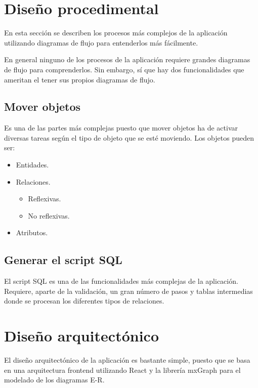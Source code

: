 \section{Diseño procedimental}
En esta sección se describen los procesos más complejos de la aplicación utilizando diagramas de flujo para entenderlos más fácilmente.

En general ninguno de los procesos de la aplicación requiere grandes diagramas de flujo para comprenderlos. Sin embargo, sí que hay dos funcionalidades que ameritan el tener sus propios diagramas de flujo.

\subsection{Mover objetos}
Es una de las partes más complejas puesto que mover objetos ha de activar diversas tareas según el tipo de objeto que se esté moviendo.
Los objetos pueden ser:
\begin{itemize}
    \item Entidades.
    \item Relaciones.
    \begin{itemize}
        \item Reflexivas.
        \item No reflexivas.
    \end{itemize}
    \item Atributos.
\end{itemize}


\subsection{Generar el script SQL}
El script SQL es una de las funcionalidades más complejas de la aplicación. Requiere, aparte de la validación, un gran número de pasos y tablas intermedias donde se procesan los diferentes tipos de relaciones.


\section{Diseño arquitectónico}
El diseño arquitectónico de la aplicación es bastante simple, puesto que se basa en una arquitectura frontend utilizando React y la librería mxGraph para el modelado de los diagramas E-R.

